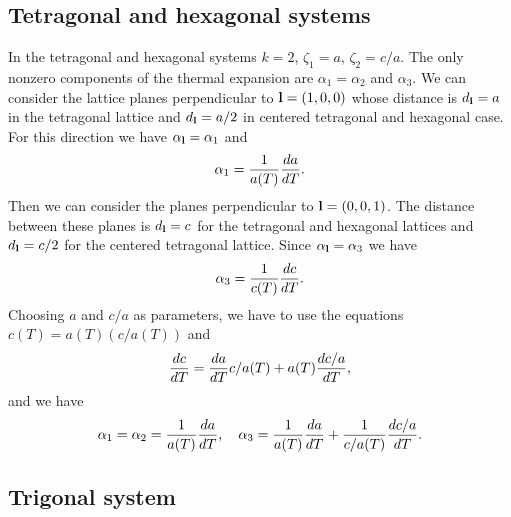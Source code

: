 \documentclass[12pt,a4paper,twoside]{report}
\begin{document}
{\color{web-blue}\subsection{Tetragonal and hexagonal systems}}
\color{black}

In the tetragonal and hexagonal systems $k=2$, $\zeta_1=a$, $\zeta_2=c/a$.
The only nonzero components of the thermal expansion are 
$\alpha_{1}=\alpha_{2}$ and $\alpha_{3}$. We can consider the
lattice planes perpendicular to ${\bf l}=(1,0,0)$ whose distance
is $d_{\bf l}=a$ in the tetragonal lattice and $d_{\bf l}=a/2$ in 
centered tetragonal and hexagonal case. 
For this direction we have $\alpha_{\bf l}=\alpha_1$ and 
\begin{equation}
\alpha_1 = {1\over a(T)} {d a \over dT}.
\end{equation}
Then we can consider the planes perpendicular to ${\bf l}=(0,0,1)$.
The distance between these planes is $d_{\bf l}=c$ for the 
tetragonal and hexagonal lattices and $d_{\bf l}=c/2$ for the 
centered tetragonal lattice. Since $\alpha_{\bf l}=\alpha_3$ we have
\begin{equation}
\alpha_3 = {1\over c(T)} {d c \over dT}. 
\end{equation}
Choosing $a$ and $c/a$ as parameters,
we have to use the equations $c(T)=a(T) (c/a(T))$ and 
\begin{equation}
{dc \over d T} = {da \over d T} c/a(T) + a(T) {d c/a \over dT},
\end{equation}
and we have
\begin{equation}
\alpha_1 = \alpha_2= {1\over a(T)} {d a \over dT}, \ \ \ 
\alpha_3 = {1\over a(T)} {da \over d T}  + {1\over c/a(T)} {d c/a \over dT}.
\end{equation}

{\color{web-blue}\subsection{Trigonal system}}
\color{black}
\end{document}
